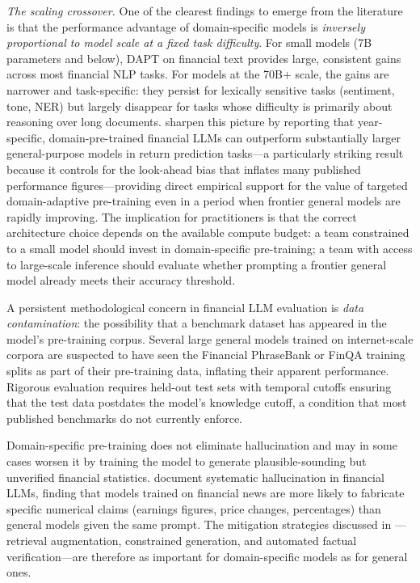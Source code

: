 \textit{The scaling crossover.}  One of the clearest findings to emerge from the
literature is that the performance advantage of domain-specific models is
\emph{inversely proportional to model scale at a fixed task difficulty}.  For small
models (7B parameters and below), DAPT on financial text provides large, consistent
gains across most financial NLP tasks.  For models at the 70B+ scale, the gains
are narrower and task-specific: they persist for lexically sensitive tasks
(sentiment, tone, NER) but largely disappear for tasks whose difficulty is
primarily about reasoning over long documents.  \citet{RahimikiaDrinkall2024} sharpen this
picture by reporting that year-specific, domain-pre-trained financial LLMs can
outperform substantially larger general-purpose models in return
prediction tasks---a particularly striking result because it controls for the
look-ahead bias that inflates many published performance figures---providing
direct empirical support for the value of targeted domain-adaptive pre-training
even in a period when frontier general models are rapidly improving.
The implication for practitioners is that the correct architecture choice depends
on the available compute budget: a team constrained to a small model should invest
in domain-specific pre-training; a team with access to large-scale inference
should evaluate whether prompting a frontier general model already meets their
accuracy threshold.

\begin{remark}
A persistent methodological concern in financial LLM evaluation is \emph{data
contamination}: the possibility that a benchmark dataset has appeared in the
model's pre-training corpus.  Several large general models trained on internet-scale
corpora are suspected to have seen the Financial PhraseBank or FinQA training
splits as part of their pre-training data, inflating their apparent performance.
Rigorous evaluation requires held-out test sets with temporal cutoffs ensuring
that the test data postdates the model's knowledge cutoff, a condition that most
published benchmarks do not currently enforce.
\end{remark}

\begin{remark}
Domain-specific pre-training does not eliminate hallucination and may in some
cases worsen it by training the model to generate plausible-sounding but
unverified financial statistics.  \citet{kang2023hallucination} document
systematic hallucination in financial LLMs, finding that models trained on
financial news are more likely to fabricate specific numerical claims (earnings
figures, price changes, percentages) than general models given the same prompt.
The mitigation strategies discussed in ---
retrieval augmentation, constrained generation, and automated factual
verification---are therefore as important for domain-specific models as for
general ones.
\end{remark}

